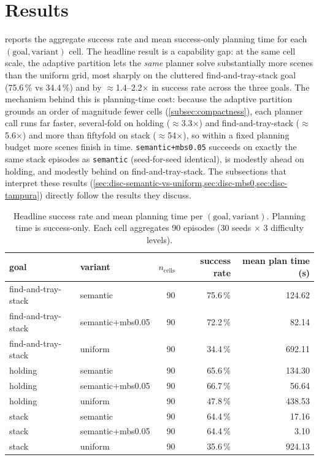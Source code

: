 \section{Results}
\label{sec:results-numbers}

 reports the aggregate success rate and mean success-only planning time for each $(\text{goal}, \text{variant})$ cell. The headline result is a capability gap: at the same cell scale, the adaptive partition lets the \emph{same} planner solve substantially more scenes than the uniform grid, most sharply on the cluttered find-and-tray-stack goal (75.6\,\% vs 34.4\,\%) and by $\approx$1.4--2.2$\times$ in success rate across the three goals. The mechanism behind this is planning-time cost: because the adaptive partition grounds an order of magnitude fewer cells (\cref{subsec:compactness}), each planner call runs far faster, several-fold on holding ($\approx$3.3$\times$) and find-and-tray-stack ($\approx$5.6$\times$) and more than fiftyfold on stack ($\approx$54$\times$), so within a fixed planning budget more scenes finish in time. \texttt{semantic+mbs0.05} succeeds on exactly the same stack episodes as \texttt{semantic} (seed-for-seed identical), is modestly ahead on holding, and modestly behind on find-and-tray-stack. The subsections that interpret these results (\cref{sec:disc-semantic-vs-uniform,sec:disc-mbs0,sec:disc-tampura}) directly follow the results they discuss.

\begin{table}[H]
\centering
\small
\begin{tabular}{llrrr}
\toprule
goal & variant & $n_\text{cells}$ & success rate & mean plan time (s) \\
\midrule
find-and-tray-stack & semantic         & 90 & 75.6\,\% & 124.62 \\
find-and-tray-stack & semantic+mbs0.05 & 90 & 72.2\,\% & 82.14 \\
find-and-tray-stack & uniform          & 90 & 34.4\,\% & 692.11 \\
\midrule
holding             & semantic         & 90 & 65.6\,\% & 134.30 \\
holding             & semantic+mbs0.05 & 90 & 66.7\,\% & 56.64 \\
holding             & uniform          & 90 & 47.8\,\% & 438.53 \\
\midrule
stack               & semantic         & 90 & 64.4\,\% & 17.16 \\
stack               & semantic+mbs0.05 & 90 & 64.4\,\% &  3.10 \\
stack               & uniform          & 90 & 35.6\,\% & 924.13 \\
\bottomrule
\end{tabular}
\caption{Headline success rate and mean planning time per $(\text{goal}, \text{variant})$. Planning time is success-only. Each cell aggregates 90 episodes (30 seeds $\times$ 3 difficulty levels).}
\label{tab:headline}
\end{table}

